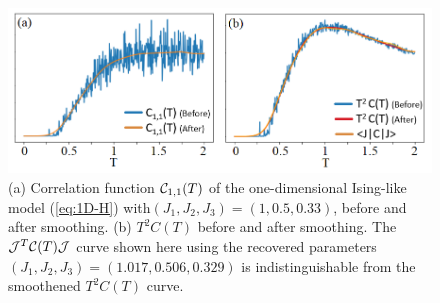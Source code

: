 \documentclass[reprint,amsmath,amssymb,aps,showpacs,superscriptaddress,prb]{revtex4-1}
\newcommand{\ba}{\begin{eqnarray}}
\newcommand{\ea}{\end{eqnarray}}
\newcommand{\nn}{\nonumber \\}
\begin{document}
%


\begin{figure}
  \centering
\includegraphics[scale=0.45]{fig1.png}
\caption{(a) Correlation function ${\cal C}_{1,1}(T)$ of the one-dimensional Ising-like model (\ref{eq:1D-H}) with$(J_1, J_2, J_3 ) = (1, 0.5 , 0.33)$, before and after smoothing. (b) $T^2 C(T)$ before and after smoothing. The ${\cal J}^T {\cal C}(T) {\cal J}$ curve shown here using the recovered parameters $(J_1, J_2, J_3 ) = (1.017, 0.506, 0.329)$ is indistinguishable from the smoothened $T^2 C(T)$ curve.}\label{fig:1}
\end{figure}
\end{document}
